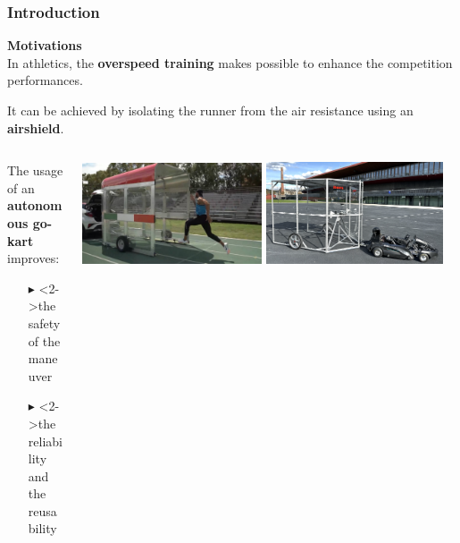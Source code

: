 \documentclass[9pt, aspectratio=169]{beamer}
\begin{document}
\begin{frame}[t]
\frametitle{Introduction}
\vspace{0.1cm}
\textcolor{emph@Thesis}{\textbf{\small{Motivations}}} \\
\vspace{0.3cm}
In athletics, the \textbf{overspeed training} makes possible to enhance the competition performances.

It can be achieved by isolating the runner from the air resistance using an \textbf{airshield}.

\begin{columns}
\hspace{0.2cm}
\begin{column}{0.38\textwidth}
\footnotesize
{}
The usage of an \textbf{autonomous go-kart} improves:
	\begin{itemize}
		\footnotesize
		\item[$\blacktriangleright$] <2->the safety of the maneuver
		\item[$\blacktriangleright$] <2->the reliability and the reusability 
	\end{itemize}
\end{column}
\begin{column}{0.62\textwidth}
\vspace{0.3cm}
	\begin{center}
  		\includegraphics[width=0.48\textwidth]{Jacobs} 
		\includegraphics[width=0.47\textwidth]{Windshield} 
	\end{center}
\end{column}
\end{columns}
\vspace{0.3cm}


\end{frame}
\end{document}
